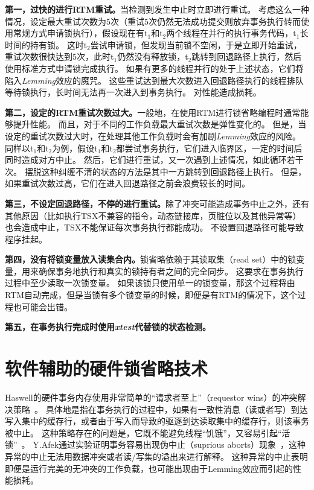 \textbf{第一，过快的进行RTM重试。}当检测到发生中止时立即进行重试。
考虑这么一种情况，设定最大重试次数为5次（重试5次仍然无法成功提交则放弃事务执行转而使用常规方式申请锁执行），假设现在有t$_1$和t$_2$两个线程在并行的执行事务代码，t$_1$长时间的持有锁。
这时t$_2$尝试申请锁，但发现当前锁不空闲，于是立即开始重试，重试次数很快达到5次，此时t$_1$仍然没有释放锁，t$_2$跳转到回退路径上执行，然后使用标准方式申请锁完成执行。
如果有更多的线程并行的处于上述状态，它们将陷入\textit{Lemming}效应的魔咒。
这些重试达到最大次数进入回退路径执行的线程排队等待锁执行，长时间无法再一次进入到事务执行。
对性能造成损耗。

\textbf{第二，设定的RTM重试次数过大。}一般地，在使用RTM进行锁省略编程时通常能够提升性能。
而且，对于不同的工作负载最大重试次数是弹性变化的。
但是，当设定的重试次数过大时，在处理其他工作负载时会有加剧\textit{Lemming}效应的风险。
同样以t$_1$和t$_2$为例，假设t$_1$和t$_2$都尝试事务执行，它们进入临界区，一定的时间后同时造成对方中止。
然后，它们进行重试，又一次遇到上述情况，如此循环若干次。
摆脱这种纠缠不清的状态的方法是其中一方跳转到回退路径上执行。
但是，如果重试次数过高，它们在进入回退路径之前会浪费较长的时间。

\textbf{第三，不设定回退路径，不停的进行重试。}除了冲突可能造成事务中止之外，还有其他原因（比如执行TSX不兼容的指令，动态链接库，页脏位以及其他异常等）也会造成中止，TSX不能保证每次事务执行都能成功。
不设置回退路径可能导致程序挂起。

\textbf{第四，没有将锁变量放入读集合内。}锁省略依赖于其读取集（read set）中的锁变量，用来确保事务地执行和真实的锁持有者之间的完全同步。
这要求在事务执行过程中至少读取一次锁变量。
如果该锁只使用单一的锁变量，那这个过程将由RTM自动完成，但是当锁有多个锁变量的时候，即便是有RTM的情况下，这个过程也可能会出错。

\textbf{第五，在事务执行完成时使用\textit{xtest}代替锁的状态检测。}

\section{软件辅助的硬件锁省略技术}

Haswell的硬件事务内存使用非常简单的“请求者至上”（requestor wins）的冲突解决策略~\cite{2011Intel}。
具体地是指在事务执行的过程中，如果有一致性消息（读或者写）到达写入集中的缓存行，或者由于写入而导致的驱逐到达读取集中的缓存行，则该事务被中止。
这种策略存在的问题是，它既不能避免线程“饥饿”，又容易引起“活锁”~\cite{Bobba2007Performance}。
Y.Afek通过实验证明事务容易出现伪中止（suprious aborts）现象~\cite{Afek2014Software}，这种异常的中止无法用数据冲突或者读/写集的溢出来进行解释。
这种异常的中止表明即便是运行完美的无冲突的工作负载，也可能出现由于Lemming效应而引起的性能损耗。


